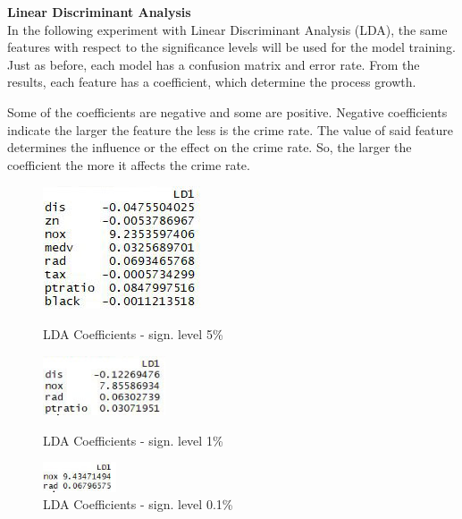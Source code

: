 \noindent
\textbf{Linear Discriminant Analysis} \\
In the following experiment with Linear Discriminant Analysis (LDA), the same features with respect to the significance levels will be used for the model training. Just as before, each model has a confusion matrix and error rate. From the results, each feature has a coefficient, which determine the process growth.

Some of the coefficients are negative and some are positive. Negative coefficients indicate the larger the feature the less is the crime rate. The value of said feature determines the influence or the effect on the crime rate. So, the larger the coefficient the more it affects the crime rate. 

\begin{figure}[H]
\centering
\begin{minipage}{0.32\textwidth}
\centering
    \includegraphics[width=\linewidth]{Graphics/Assignment1/LDACoefficients_005_1.jpg}
    \caption{LDA Coefficients - sign. level 5\%}
    \label{fig:LDA_005}
\end{minipage}\hfill
\begin{minipage}{0.32\textwidth}
\centering

\includegraphics[width=\linewidth, height= 50pt]{Graphics/Assignment1/LDACoefficients_001_1.jpg}
    \caption{LDA Coefficients - sign. level 1\%}
    \label{fig:LDA_001}
\end{minipage}\hfill
\begin{minipage}{0.32\textwidth}
\centering

\includegraphics[width=\linewidth, height=25pt]{Graphics/Assignment1/LDACoefficients_0001_1.jpg}
    \caption{LDA Coefficients - sign. level 0.1\%}
    \label{fig:LDA_0001}
\end{minipage}
\end{figure}

